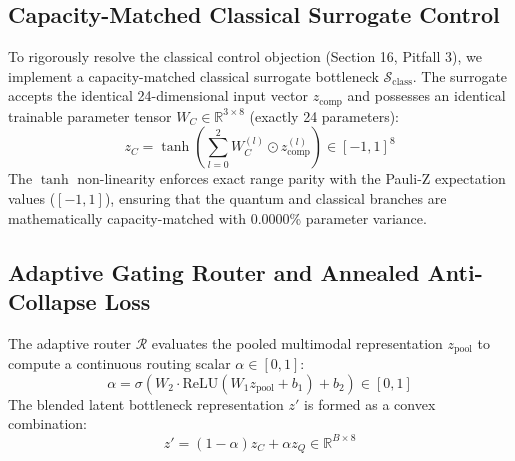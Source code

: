 \subsection{Capacity-Matched Classical Surrogate Control}
To rigorously resolve the classical control objection (Section 16, Pitfall 3), we implement a capacity-matched classical surrogate bottleneck $\mathcal{S}_{\text{class}}$. 
The surrogate accepts the identical 24-dimensional input vector $z_{\text{comp}}$ and possesses an identical trainable parameter tensor $W_C \in \mathbb{R}^{3 \times 8}$ (exactly 24 parameters):
\begin{equation}
    z_C = \tanh\left( \sum_{l=0}^{2} W_C^{(l)} \odot z_{\text{comp}}^{(l)} \right) \in [-1, 1]^8
\end{equation}
The $\tanh$ non-linearity enforces exact range parity with the Pauli-Z expectation values ($[-1, 1]$), ensuring that the quantum and classical branches are mathematically capacity-matched with 0.0000\% parameter variance.

\subsection{Adaptive Gating Router and Annealed Anti-Collapse Loss}
The adaptive router $\mathcal{R}$ evaluates the pooled multimodal representation $z_{\text{pool}}$ to compute a continuous routing scalar $\alpha \in [0, 1]$:
\begin{equation}
    \alpha = \sigma\left( W_2 \cdot \text{ReLU}(W_1 z_{\text{pool}} + b_1) + b_2 \right) \in [0, 1]
\end{equation}
The blended latent bottleneck representation $z'$ is formed as a convex combination:
\begin{equation}
    z' = (1 - \alpha) z_C + \alpha z_Q \in \mathbb{R}^{B \times 8}
\end{equation}

